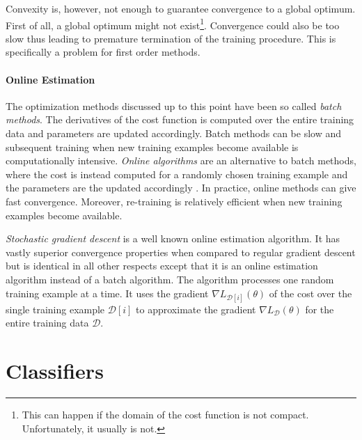Convexity is, however, not enough to guarantee convergence to a global
optimum. First of all, a global optimum might not exist\footnote{This
  can happen if the domain of the cost function is not
  compact. Unfortunately, it usually is not.}. Convergence could also
be too slow thus leading to premature termination of the training
procedure. This is specifically a problem for first order methods.

\paragraph{Online Estimation} The optimization methods
discussed up to this point have been so called {\it batch
  methods}. The derivatives of the cost function is computed over the
entire training data and parameters are updated accordingly. Batch
methods can be slow and subsequent training when new training examples
become available is computationally intensive. {\it Online algorithms}
are an alternative to batch methods, where the cost is instead
computed for a randomly chosen training example and the parameters are
the updated accordingly \cite{someone}. In practice, online methods
can give fast convergence. Moreover, re-training is relatively
efficient when new training examples become available.

{\it Stochastic gradient descent} is a well known online estimation
algorithm. It has vastly superior convergence properties when compared
to regular gradient descent \cite{someone} but is identical in all
other respects except that it is an online estimation algorithm
instead of a batch algorithm. The algorithm processes one random
training example at a time. It uses the gradient $\nabla
L_{\mathcal{D}[i]}(\theta)$ of the cost over the single training
example $\mathcal{D}[i]$ to approximate the gradient $\nabla
L_{\mathcal{D}}(\theta)$ for the entire training data $\mathcal{D}$.

\section{Classifiers}

